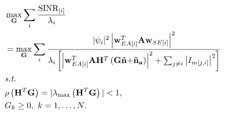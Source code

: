 \begin{align}
\label{multi_bss_obj}
&\max_\mathbf{G} \sum_i \frac{\text{SINR}_{[i]}}{\lambda_i} \\
& = \max_\mathbf{G} \sum_i
\frac{{{{|\psi_i|^2\left|\mathbf{w}_{EA[i]}^T\mathbf{A}{\mathbf{w}_{SE[i]}} \right|}^2}}}{\lambda_i\left[{{{\left| {\mathbf{w}_{EA[i]}^T\mathbf{A}{\mathbf{H}^T}\left( {\mathbf{G\tilde n + }{{\mathbf{\tilde n}}_\mathbf{a}}} \right)} \right|}^2}} + \sum_{j\neq i}\left|I_{m[j,i]}\right|^2\right]} \notag \\
&\textit{s.t.} \notag \\
& \rho\left({\mathbf{H}^T}\mathbf{G}\right)=|\lambda_{\max}\left({\mathbf{H}^T}\mathbf{G}\right)|<1, \notag \\
& G_k\geq0,{\ }k=1,\dots, N \text{.} \notag
\end{align}